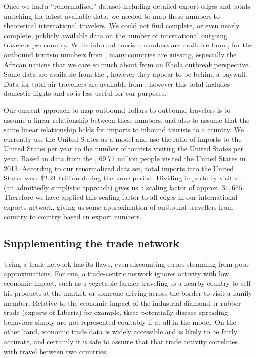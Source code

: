 \documentclass[10pt, journal,onecolumn]{IEEEtran}
\begin{document}
Once we had a ``renormalized'' dataset including detailed export edges and totals matching
the latest available data, we needed to map these numbers to theoretical international travelers.
We could not find complete, or even nearly complete, publicly available data on the number of
international outgoing travelers per country. While inbound tourism numbers are available from
\citep{worldbankinboundtourism}, for the outbound tourism numbers from \citep{worldbankoutboundtourism},
many countries are missing,
especially the African nations that we care so much about from an Ebola outbreak perspective.
Some data are available from the \citep{unwtooutboundtourism}, however they appear to be behind a paywall.
Data for total air travellers are available from \citep{worldbankairpassengers},
however this total includes domestic flights and so is less useful for our purposes.

Our current approach to map outbound dollars to outbound travelers is to assume a linear relationship
between these numbers, and also to assume that the same linear relationship holds for imports to
inbound tourists to a country.
We currently use the United States as a model and use the ratio of
imports to the United States per year to the number of tourists visiting the United States per year.
Based on data from the \citep{usinboundtourists}, 69.77 million people visited the United States in 2013.
According to our renormalized data set, total imports into the United States were
\$$2.21$ trillion during the same period. Dividing imports by visitors (an admittedly
simplistic approach) gives us a scaling factor of approx. $31,665$. Therefore we have applied this
scaling factor to all edges in our international exports network, giving us some approximation of
outbound travellers from country to country based on export numbers.

\subsection{{Supplementing the trade network}}

Using a trade network has its flaws, even discounting errors stemming from poor approximations.
For one, a trade-centric network ignores activity with low economic impact, such as
a vegetable farmer traveling to a nearby country to sell his products at the market, or someone
driving across the border to visit a family member. Relative to the economic impact of the industrial
diamond or rubber trade (exports of Liberia) for example, these potentially disease-spreading behaviors
simply are not represented equitably if at all in the model. On the other hand, economic trade data is
widely accessible and is likely to be fairly accurate,
and certainly it is safe to assume that that trade activity correlates with travel between two countries.
\end{document}
